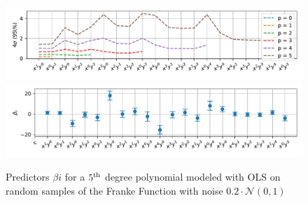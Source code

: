 \documentclass[reprint, english, nofootinbib]{revtex4-2}
\begin{document}
\begin{figure}
    \centering
    \includegraphics[width=2\columnwidth]{beta_confidence_interval_size_OLS.pdf}
    \includegraphics[width=2\columnwidth]{beta_confidence_interval_OLS.pdf}
    \caption{\label{fig:confidence intervals}Predictors $\beta{i}$ for a $5^{\textup{th}}$ degree polynomial modeled with OLS on random samples of the Franke Function with noise $0.2\cdot\mathcal{N}(0, 1)$}
\end{figure}
\end{document}
